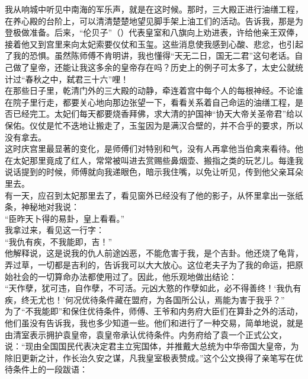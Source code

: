 我从响城中听见中南海的军乐声，就是在这时候。那时，三大殿正进行油缮工程，在养心殿的台阶上，可以清清楚楚地望见脚手架上油工们的活动。告诉我，那是为登极做准备。后来，“伦贝子”（）代表皇室和八旗向上劝进表，许给他亲王双俸，接着他又到宫里来向太妃索要仪仗和玉玺。这些消息使我感到心酸、悲忿，也引起了我的恐惧。虽然陈师傅不肯明讲，我也懂得“天无二日，国无二君”这句老话。自己做了皇帝，还能让我这多余的皇帝存在吗？历史上的例子可太多了，太史公就统计过“春秋之中，弑君三十六”哩！\\

在那些日子里，乾清门外的三大殿的动静，牵连着宫中每个人的每根神经。不论谁在院子里行走，都要关心地向那边张望一下，看看关系着自己命运的油缮工程，是否已经完工。太妃们每天都要烧香拜佛，求大清的护国神“协天大帝关圣帝君”给以保佑。仪仗是忙不迭地让搬走了，玉玺因为是满汉合壁的，并不合乎的要求，所以没有拿去。\\

这时庆宫里最显著的变化，是师傅们对特别和气，没有人再拿他当伯禽来看待。他在太妃那里竟成了红人，常常被叫进去赏赐些鼻烟壶、搬指之类的玩艺儿。每逢我说话提到的时候，师傅就向我递眼色，暗示我住嘴，以免让听见，传到他父亲耳朵里去。\\

有一天，应召到太妃那里去了，看见窗外已经没有了他的影子，从怀里拿出一张纸条，神秘地对我说：\\

“臣昨天卜得的易卦，皇上看看。”\\

我拿过来，看见这一行字：\\

“我仇有疾，不我能即，吉！”\\

他解释说，这是说我的仇人前途凶恶，不能危害于我，是个吉卦。他还烧了龟背，弄过草，一切都是吉利的，告诉我可以大大放心。这位老夫子为了我的命运，把原始社会的一切算命办法都使用过了。因此，他乐观地做出结论：\\

“天作孽，犹可违，自作孽，不可活。元凶大憝的作孽如此，必不得善终！‘我仇有疾，终无尤也！’何况优待条件藏在盟府，为各国所公认，焉能为害于我乎？”\\

为了“不我能即”和保住优待条件，师傅、王爷和内务府大臣们在算卦之外的活动，他们虽没有告诉我，我也多少知道一些。他们和进行了一种交易，简单地说，就是由清室表示拥护袁皇帝，袁皇帝承认优待条件。内务府给了袁一个正式公文，说：“现由全国国民代表决定君主立宪国体，并推戴大总统为中华帝国大皇帝，为除旧更新之计，作长治久安之谋，凡我皇室极表赞成。”这个公文换得了亲笔写在优待条件上的一段跋语：\\

